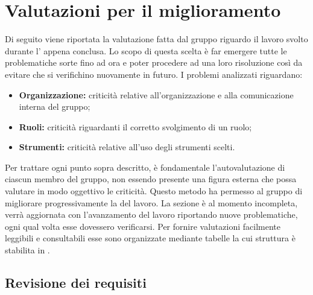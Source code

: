\appendix
\section{Valutazioni per il miglioramento}
\label{miglioramento}
Di seguito viene riportata la valutazione fatta dal gruppo {\Gruppo} riguardo il lavoro svolto durante l' appena conclusa. Lo scopo di questa scelta è far emergere tutte le problematiche sorte fino ad ora e poter procedere ad una loro risoluzione  così da evitare che si verifichino nuovamente in futuro.
I problemi analizzati riguardano:
\begin{itemize}
	\item \textbf{Organizzazione:} criticità relative all'organizzazione e alla comunicazione interna del gruppo;
	\item \textbf{Ruoli:} criticità riguardanti il corretto svolgimento di un ruolo;
	\item \textbf{Strumenti:} criticità relative all'uso degli strumenti scelti.
\end{itemize}
Per trattare ogni punto sopra descritto, è fondamentale l'autovalutazione di ciascun membro del gruppo, non essendo presente una figura esterna che possa valutare in modo oggettivo le criticità. Questo metodo ha permesso al gruppo di migliorare progressivamente la  del lavoro. La sezione è al momento incompleta, verrà aggiornata con l'avanzamento del lavoro riportando nuove problematiche, ogni qual volta esse dovessero verificarsi. Per fornire valutazioni facilmente leggibili e consultabili esse sono organizzate mediante tabelle la cui struttura è stabilita in .
\subsection{Revisione dei requisiti}
